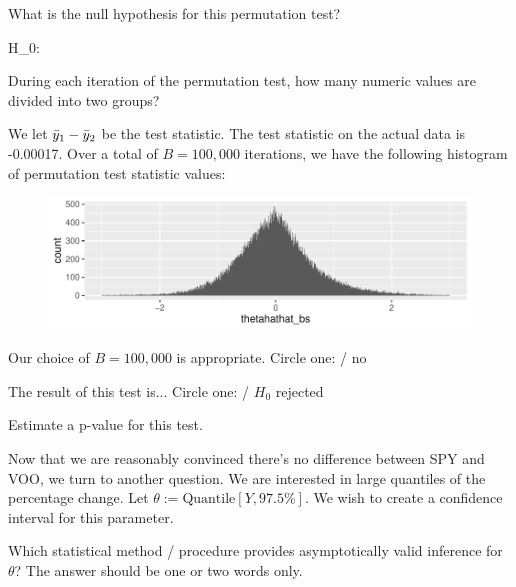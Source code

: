 \documentclass[12pt]{article}
\begin{document}
\begin{enumerate}[(a)]
 What is the null hypothesis for this permutation test?

\beqn
H_0:  \hspace{6in}
\eeqn

 During each iteration of the permutation test, how many numeric values are divided into two groups? \\


We let $\bar{y}_{1} - \bar{y}_{2}$ be the test statistic. The test statistic on the actual data is -0.00017. Over a total of $B = 100,000$ iterations, we have the following histogram of permutation test statistic values:
\pagebreak

\vspace{-0.2cm}
\begin{figure}[htp]
\centering
\includegraphics[width=6.0in]{perms}
\end{figure}
\FloatBarrier
\vspace{-0.7cm}

 Our choice of $B = 100,000$ is appropriate. Circle one:  / no 

 The result of this test is... Circle one:  / $H_0$ rejected 

 Estimate a p-value for this test. \\


Now that we are reasonably convinced there's no difference between SPY and VOO, we turn to another question. We are interested in large quantiles of the percentage change. Let $\theta := \text{Quantile}[Y, 97.5\%]$. We wish to create a confidence interval for this parameter.

 Which statistical method / procedure provides asymptotically valid inference for $\theta$? The answer should be one or two words only. \\


\end{enumerate}
\end{document}
